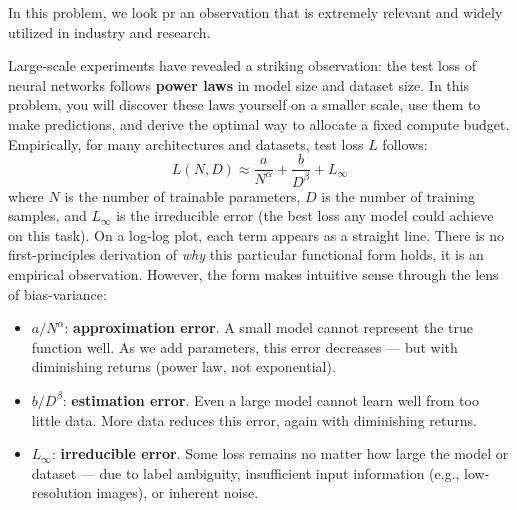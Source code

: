 \documentclass[submit]{../harvardml}
\begin{document}
\begin{problem}
In this problem, we look pr an observation that is extremely relevant and widely utilized in industry and research.

Large-scale experiments have revealed a striking observation: the test loss of neural networks follows \textbf{power laws} in model size and dataset size. In this problem, you will discover these laws yourself on a smaller scale, use them to make predictions, and derive the optimal way to allocate a fixed compute budget.
Empirically, for many architectures and datasets, test loss $L$ follows:
\begin{equation}\label{eq:scaling}
    L(N, D) \approx \frac{a}{N^{\alpha}} + \frac{b}{D^{\beta}} + L_{\infty}
\end{equation}
where $N$ is the number of trainable parameters, $D$ is the number of training samples, and $L_\infty$ is the irreducible error (the best loss any model could achieve on this task). On a log-log plot, each term appears as a straight line.
There is no first-principles derivation of \emph{why} this particular functional form holds, it is an empirical observation. However, the form makes intuitive sense through the lens of bias-variance:
\begin{itemize}
    \item $a / N^\alpha$: \textbf{approximation error}. A small model cannot represent the true function well. As we add parameters, this error decreases --- but with diminishing returns (power law, not exponential).
    \item $b / D^\beta$: \textbf{estimation error}. Even a large model cannot learn well from too little data. More data reduces this error, again with diminishing returns.
    \item $L_\infty$: \textbf{irreducible error}. Some loss remains no matter how large the model or dataset --- due to label ambiguity, insufficient input information (e.g., low-resolution images), or inherent noise.
\end{itemize}

\end{problem}
\end{document}
